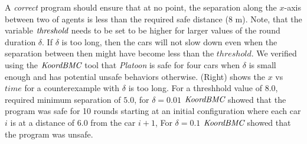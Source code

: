  A \emph{correct} program should ensure that at no point, the separation along the $x$-axis between two of agents is less than the required safe distance ($8$ m).  Note, that the variable $\emph{threshold}$ needs to be set to be higher for larger values of the round duration $\delta$. If $\delta$ is too long, then the cars will not slow down even when the separation between then might have become less than the $\mathit{threshold}$. We verified using the $\emph{KoordBMC}$ tool that \emph{Platoon} is safe for four cars when $\delta$ is small enough and has potential unsafe behaviors otherwise. (Right) shows the $x$ vs $\mathit{time}$ for a counterexample with  $\delta$ is too long. For a threshhold value of $8.0$, required minimum separation of $5.0$, for $\delta = 0.01$ $\emph{KoordBMC}$  showed that the program was safe for 10 rounds starting at an initial configuration where each car $i$ is at a distance of 6.0 from the car $\mathit{i}+1$, For $\delta = 0.1$ $\emph{KoordBMC}$ showed that the program was unsafe. 
 

